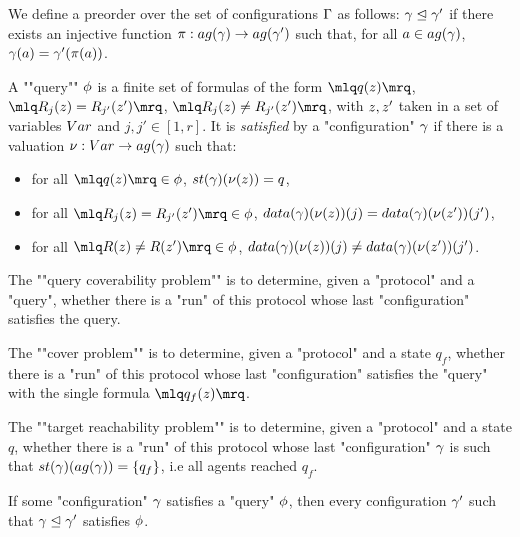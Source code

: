 \begin{definition}[Semantics]
	
	\begin{definition}
		We define a preorder over the set of configurations $\Gamma$ as follows: $\gamma \trianglelefteq \gamma'$ if there exists an injective function $\pi: \agentsof{\config} \rightarrow \agentsof{\config'}$ such that, for all $a \in \agentsof{\config}$, $\gamma(a) = \gamma'(\pi(a))$. 
	\end{definition}
	
	\begin{definition}
		A ""query"" $\phi$ is a finite set of formulas of the form $\quotemarks{q(\var{z})}$, $\quotemarks{R_j(\var{z}) = R_{j'}(\var{z}')}$, $\quotemarks{R_j(\var{z}) \neq R_{j'}(\var{z}')}$, with $\var{z}, \var{z}'$ taken in a set of variables $\varset$ and $j,j' \in [1,r]$.
		It is \emph{satisfied} by a "configuration" $\gamma$ if there is a valuation $\nu : \varset \to \agentsof{\config}$ such that:
		\begin{itemize}
			\item for all $\quotemarks{q(\var{z})} \in \query$, $\st{\config}(\nu(\var{z})) = q$,
			
			\item for all $\quotemarks{R_j(\var{z}) = R_{j'}(\var{z'})} \in \query$, $\data{\config}(\nu(\var{z}))(j) = \data{\config}(\nu(\var{z'}))(j')$,
			
			\item for all $\quotemarks{R(\var{z}) \neq R(\var{z'})} \in \query$, $\data{\config}(\nu(\var{z}))(j) \neq \data{\config}(\nu(\var{z'}))(j')$.
		\end{itemize}
		
		\AP The ""query coverability problem"" is to determine, given a "protocol" and a "query", whether there is a "run" of this protocol whose last "configuration" satisfies the query.
	\end{definition}

	\AP The ""cover problem"" is to determine, given a "protocol" and a state $q_f$, whether there is a "run" of this protocol whose last "configuration" satisfies the "query" with the single formula $\quotemarks{q_f(\var{z})}$.
	
	\AP The ""target reachability problem"" is to determine, given a "protocol" and a state $q$, whether there is a "run" of this protocol whose last "configuration" $\gamma$ is such that $\st{\config}(\agentsof{\gamma}) = \{q_f\}$, i.e all agents reached $q_f$.
	
	\begin{remark}
		\label{rem:bigger_config_query}
		If some "configuration" $\gamma$ satisfies a "query" $\phi$, then every configuration $\gamma'$ such that $\gamma \trianglelefteq \gamma'$ satisfies $\phi$. 
	\end{remark}
	
\end{definition}


